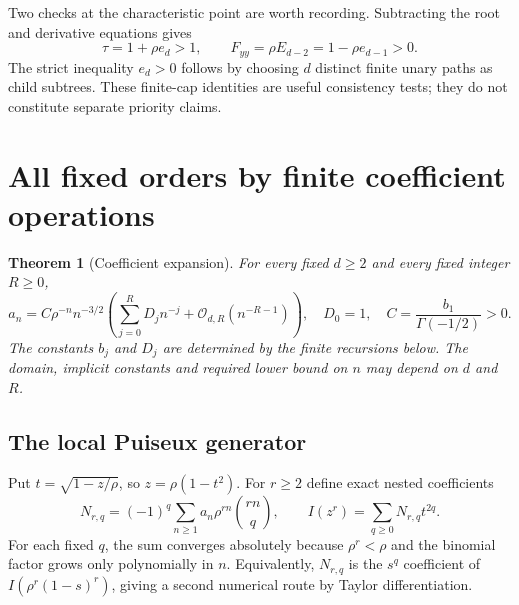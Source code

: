 \documentclass[11pt]{article}
\newtheorem{theorem}{Theorem}[section]
\theoremstyle{definition}\newtheorem{definition}[theorem]{Definition}
\theoremstyle{remark}\newtheorem{remark}[theorem]{Remark}
\newcommand{\bigO}{\mathcal O}
\begin{document}
Two checks at the characteristic point are worth recording. Subtracting the root and derivative equations gives
\begin{equation}
 \tau=1+\rho e_d>1,\qquad
 F_{yy}=\rho E_{d-2}=1-\rho e_{d-1}>0.
 \label{bit:eq:taucheck}
\end{equation}
The strict inequality $e_d>0$ follows by choosing $d$ distinct finite unary paths as child subtrees. These finite-cap identities are useful consistency tests; they do not constitute separate priority claims.

\section{All fixed orders by finite coefficient operations}
\label{bit:sec:allorders}
\begin{theorem}[Coefficient expansion]
\label{bit:thm:coeff}
For every fixed $d\ge2$ and every fixed integer $R\ge0$,
\begin{equation}
 a_n=C\rho^{-n}n^{-3/2}
 \left(\sum_{j=0}^R D_jn^{-j}+\bigO_{d,R}(n^{-R-1})\right),
 \quad D_0=1,\quad C=\frac{b_1}{\Gamma(-1/2)}>0.
 \label{bit:eq:allorders}
\end{equation}
The constants $b_j$ and $D_j$ are determined by the finite recursions below. The domain, implicit constants and required lower bound on $n$ may depend on $d$ and $R$.
\end{theorem}

\subsection{The local Puiseux generator}
Put $t=\sqrt{1-z/\rho}$, so $z=\rho(1-t^2)$. For $r\ge2$ define exact nested coefficients
\begin{equation}
 N_{r,q}=(-1)^q\sum_{n\ge1}a_n\rho^{rn}\binom{rn}{q},
 \qquad I(z^r)=\sum_{q\ge0}N_{r,q}t^{2q}.
 \label{bit:eq:nested}
\end{equation}
For each fixed $q$, the sum converges absolutely because $\rho^r<\rho$ and the binomial factor grows only polynomially in $n$. Equivalently, $N_{r,q}$ is the $s^q$ coefficient of
$I(\rho^r(1-s)^r)$, giving a second numerical route by Taylor differentiation.
\end{document}
